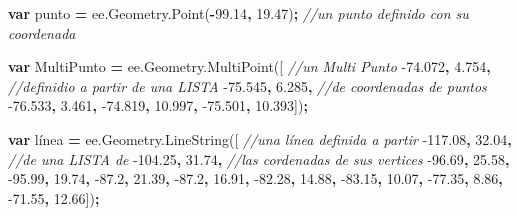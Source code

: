 \documentclass[
]{article}
\newenvironment{Shaded}{\begin{snugshade}}{\end{snugshade}}
\newcommand{\AttributeTok}[1]{\textcolor[rgb]{0.77,0.63,0.00}{#1}}
\newcommand{\CommentTok}[1]{\textcolor[rgb]{0.56,0.35,0.01}{\textit{#1}}}
\newcommand{\FloatTok}[1]{\textcolor[rgb]{0.00,0.00,0.81}{#1}}
\newcommand{\KeywordTok}[1]{\textcolor[rgb]{0.13,0.29,0.53}{\textbf{#1}}}
\newcommand{\NormalTok}[1]{#1}
\newcommand{\OperatorTok}[1]{\textcolor[rgb]{0.81,0.36,0.00}{\textbf{#1}}}
\newcommand{\VariableTok}[1]{\textcolor[rgb]{0.00,0.00,0.00}{#1}}
\begin{document}
\begin{Shaded}
\begin{Highlighting}[]
\KeywordTok{var}\NormalTok{ punto }\OperatorTok{=} \VariableTok{ee}\NormalTok{.}\VariableTok{Geometry}\NormalTok{.}\AttributeTok{Point}\NormalTok{(}\OperatorTok{-}\FloatTok{99.14}\OperatorTok{,} \FloatTok{19.47}\NormalTok{)}\OperatorTok{;} \CommentTok{//un punto definido con su coordenada  }

\KeywordTok{var}\NormalTok{ MultiPunto }\OperatorTok{=} \VariableTok{ee}\NormalTok{.}\VariableTok{Geometry}\NormalTok{.}\AttributeTok{MultiPoint}\NormalTok{([     }\CommentTok{//un Multi Punto }
  \FloatTok{-74.072}\OperatorTok{,} \FloatTok{4.754}\OperatorTok{,}                               \CommentTok{//definidio a partir de una LISTA}
  \FloatTok{-75.545}\OperatorTok{,} \FloatTok{6.285}\OperatorTok{,}                              \CommentTok{//de coordenadas de puntos}
  \FloatTok{-76.533}\OperatorTok{,} \FloatTok{3.461}\OperatorTok{,}
  \FloatTok{-74.819}\OperatorTok{,} \FloatTok{10.997}\OperatorTok{,}
  \FloatTok{-75.501}\OperatorTok{,} \FloatTok{10.393}\NormalTok{])}\OperatorTok{;}

\KeywordTok{var}\NormalTok{ línea }\OperatorTok{=} \VariableTok{ee}\NormalTok{.}\VariableTok{Geometry}\NormalTok{.}\AttributeTok{LineString}\NormalTok{([  }\CommentTok{//una línea definida a partir}
  \FloatTok{-117.08}\OperatorTok{,} \FloatTok{32.04}\OperatorTok{,}                     \CommentTok{//de una LISTA de}
  \FloatTok{-104.25}\OperatorTok{,} \FloatTok{31.74}\OperatorTok{,}                     \CommentTok{//las cordenadas de sus vertices}
  \FloatTok{-96.69}\OperatorTok{,} \FloatTok{25.58}\OperatorTok{,}
  \FloatTok{-95.99}\OperatorTok{,} \FloatTok{19.74}\OperatorTok{,}
  \FloatTok{-87.2}\OperatorTok{,} \FloatTok{21.39}\OperatorTok{,}
  \FloatTok{-87.2}\OperatorTok{,} \FloatTok{16.91}\OperatorTok{,}
  \FloatTok{-82.28}\OperatorTok{,} \FloatTok{14.88}\OperatorTok{,}
  \FloatTok{-83.15}\OperatorTok{,} \FloatTok{10.07}\OperatorTok{,}
  \FloatTok{-77.35}\OperatorTok{,} \FloatTok{8.86}\OperatorTok{,}
  \FloatTok{-71.55}\OperatorTok{,} \FloatTok{12.66}\NormalTok{])}\OperatorTok{;} 


\end{Highlighting}
\end{Shaded}
\end{document}
